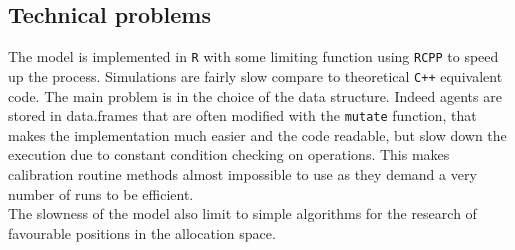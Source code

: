 \subsection{Technical problems}

The model is implemented in \texttt{R} with some limiting function using \texttt{RCPP} to speed up the process. Simulations are fairly slow compare to theoretical \texttt{C++} equivalent code. The main problem is in the choice of the data structure. Indeed agents are stored in data.frames that are often modified with the \verb|mutate| function, that makes the implementation much easier and the code readable, but slow down the execution due to constant condition checking on operations. This makes calibration routine methods almost impossible to use as they demand a very number of runs to be efficient.\\
\indent The slowness of the model also limit to simple algorithms for the research of favourable positions in the allocation space.
